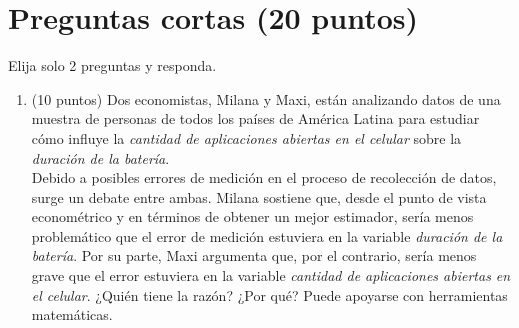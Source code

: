 \documentclass[10pt,a4paper]{article}
\begin{document}
\section{Preguntas cortas (20 puntos)}
Elija solo 2 preguntas y responda. 
\begin{enumerate}
    \item (10 puntos) Dos economistas, Milana y Maxi, están analizando datos de una muestra de personas de todos los países de América Latina para estudiar cómo influye la \textit{cantidad de aplicaciones abiertas en el celular} sobre la \textit{duración de la batería}. \\
    Debido a posibles errores de medición en el proceso de recolección de datos, surge un debate entre ambas. Milana sostiene que, desde el punto de vista econométrico y en términos de obtener un mejor estimador, sería menos problemático que el error de medición estuviera en la variable \textit{duración de la batería}. Por su parte, Maxi argumenta que, por el contrario, sería menos grave que el error estuviera en la variable \textit{cantidad de aplicaciones abiertas en el celular}. ¿Quién tiene la razón? ¿Por qué? Puede apoyarse con herramientas matemáticas.\\

\end{enumerate}
\end{document}
